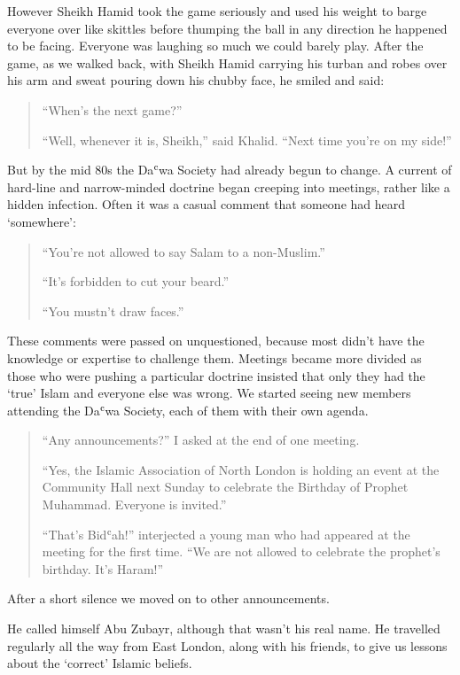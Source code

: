 \documentclass[12pt]{memoir}
\def\`{ʿ} %
\begin{document}
However Sheikh Hamid took the game seriously
and used his weight to barge everyone over like skittles
before thumping the ball in any direction he happened to be facing.
Everyone was laughing so much we could barely play.
After the game, as we walked back, with Sheikh Hamid carrying his turban
and robes over his arm and sweat pouring down his chubby face,
he smiled and said:

\begin{quote}
“When’s the next game?”

“Well, whenever it is, Sheikh,” said Khalid.
“Next time you’re on my side!”
\end{quote}

But by the mid 80s the Da\`wa Society had already begun to change.
A current of hard-line and narrow-minded doctrine began creeping into meetings,
rather like a hidden infection.
Often it was a casual comment that someone had heard ‘somewhere’:

\begin{quote}
“You’re not allowed to say Salam to a non-Muslim.”

“It’s forbidden to cut your beard.”

“You mustn’t draw faces.”
\end{quote}

These comments were passed on unquestioned,
because most didn’t have the knowledge or expertise to challenge them.
Meetings became more divided as those who were pushing a particular doctrine
insisted that only they had the ‘true’ Islam and everyone else was wrong.
We started seeing new members attending the Da\`wa Society,
each of them with their own agenda.

\begin{quote}
“Any announcements?” I asked at the end of one meeting.

“Yes, the Islamic Association of North London is holding
an event at the Community Hall next Sunday
to celebrate the Birthday of Prophet Muhammad.
Everyone is invited.”

“That’s Bid\`ah!” interjected a young man
who had appeared at the meeting for the first time.
“We are not allowed to celebrate the prophet’s birthday.
It’s Haram!”
\end{quote}

After a short silence we moved on to other announcements.

He called himself Abu Zubayr, although that wasn’t his real name.
He travelled regularly all the way from East London, along with his friends,
to give us lessons about the ‘correct’ Islamic beliefs.
\end{document}
